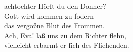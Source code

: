 \documentclass[tocstyle=ref-genre]{ees}
\begin{document}
{\begin{movement}{achtochter}
  \voice[Adam]
  Hörſt du den Donner?\\
  Gott wird kommen zu fodern\\
  das vergoßne Blut des Frommen.\\
  Ach, Eva! laß uns zu dem Richter flehn,\\
  vielleicht erbarmt er ſich des Fliehenden.
\end{movement}








}

\eesScore
\end{document}
